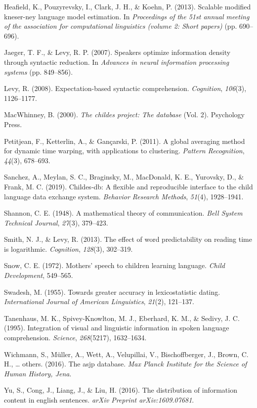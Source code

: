 \documentclass[10pt, letterpaper]{article}
\begin{document}
\leavevmode\hypertarget{ref-heafield2013}{}%
Heafield, K., Pouzyrevsky, I., Clark, J. H., \& Koehn, P. (2013).
Scalable modified kneser-ney language model estimation. In
\emph{Proceedings of the 51st annual meeting of the association for
computational linguistics (volume 2: Short papers)} (pp. 690--696).

\leavevmode\hypertarget{ref-jaeger2007}{}%
Jaeger, T. F., \& Levy, R. P. (2007). Speakers optimize information
density through syntactic reduction. In \emph{Advances in neural
information processing systems} (pp. 849--856).

\leavevmode\hypertarget{ref-levy2008}{}%
Levy, R. (2008). Expectation-based syntactic comprehension.
\emph{Cognition}, \emph{106}(3), 1126--1177.

\leavevmode\hypertarget{ref-macwhinney2000}{}%
MacWhinney, B. (2000). \emph{The childes project: The database} (Vol.
2). Psychology Press.

\leavevmode\hypertarget{ref-petitjean2011}{}%
Petitjean, F., Ketterlin, A., \& Gançarski, P. (2011). A global
averaging method for dynamic time warping, with applications to
clustering. \emph{Pattern Recognition}, \emph{44}(3), 678--693.

\leavevmode\hypertarget{ref-sanchez2019}{}%
Sanchez, A., Meylan, S. C., Braginsky, M., MacDonald, K. E., Yurovsky,
D., \& Frank, M. C. (2019). Childes-db: A flexible and reproducible
interface to the child language data exchange system. \emph{Behavior
Research Methods}, \emph{51}(4), 1928--1941.

\leavevmode\hypertarget{ref-shannon1948}{}%
Shannon, C. E. (1948). A mathematical theory of communication.
\emph{Bell System Technical Journal}, \emph{27}(3), 379--423.

\leavevmode\hypertarget{ref-smith2013}{}%
Smith, N. J., \& Levy, R. (2013). The effect of word predictability on
reading time is logarithmic. \emph{Cognition}, \emph{128}(3), 302--319.

\leavevmode\hypertarget{ref-snow1972}{}%
Snow, C. E. (1972). Mothers' speech to children learning language.
\emph{Child Development}, 549--565.

\leavevmode\hypertarget{ref-swadesh1955}{}%
Swadesh, M. (1955). Towards greater accuracy in lexicostatistic dating.
\emph{International Journal of American Linguistics}, \emph{21}(2),
121--137.

\leavevmode\hypertarget{ref-tanenhaus1995}{}%
Tanenhaus, M. K., Spivey-Knowlton, M. J., Eberhard, K. M., \& Sedivy, J.
C. (1995). Integration of visual and linguistic information in spoken
language comprehension. \emph{Science}, \emph{268}(5217), 1632--1634.

\leavevmode\hypertarget{ref-wichmann2016}{}%
Wichmann, S., Müller, A., Wett, A., Velupillai, V., Bischoffberger, J.,
Brown, C. H., \ldots{} others. (2016). The asjp database. \emph{Max
Planck Institute for the Science of Human History, Jena}.

\leavevmode\hypertarget{ref-yu2016}{}%
Yu, S., Cong, J., Liang, J., \& Liu, H. (2016). The distribution of
information content in english sentences. \emph{arXiv Preprint
arXiv:1609.07681}.


\end{document}
